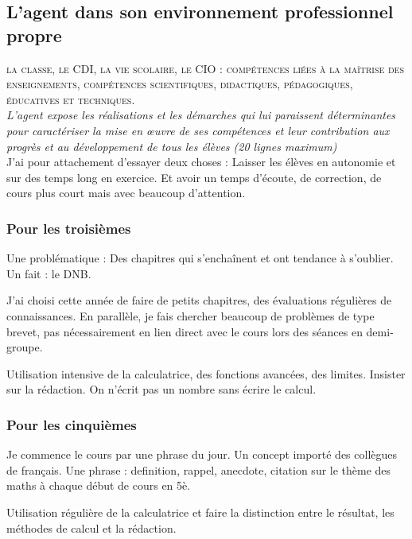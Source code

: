 \documentclass[11pt]{article}
\begin{document}
\subsection{L’agent dans son environnement professionnel propre}

\textsc{la classe, le CDI, la vie scolaire, le CIO : compétences liées à la maîtrise des enseignements, compétences scientifiques, didactiques, pédagogiques, éducatives et techniques.}\\

\textit{L’agent expose les réalisations et les démarches qui lui paraissent déterminantes pour caractériser la mise en œuvre de ses compétences et leur contribution aux progrès et au développement de tous les élèves (20 lignes maximum)}\\

J'ai pour attachement d'essayer deux choses : Laisser les élèves en autonomie et sur des temps long en exercice. Et avoir un temps d'écoute, de correction, de cours plus court mais avec beaucoup d'attention.


\subsubsection{Pour les troisièmes}

Une problématique : Des chapitres qui s'enchaînent et ont tendance à s'oublier. Un fait : le DNB. 

J'ai choisi cette année de faire de petits chapitres, des évaluations régulières de connaissances. En parallèle, je fais chercher beaucoup de problèmes de type brevet, pas nécessairement en lien direct avec le cours lors des séances en demi-groupe. 

Utilisation intensive de la calculatrice, des fonctions avancées, des limites. Insister sur la rédaction. On n'écrit pas un nombre sans écrire le calcul. 

\subsubsection{Pour les cinquièmes}

Je commence le cours par une phrase du jour. Un concept importé des collègues de français. Une phrase : definition, rappel, anecdote, citation sur le thème des maths à chaque début de cours en 5è.

Utilisation régulière de la calculatrice et faire la distinction entre le résultat, les méthodes de calcul et la rédaction.
\end{document}
